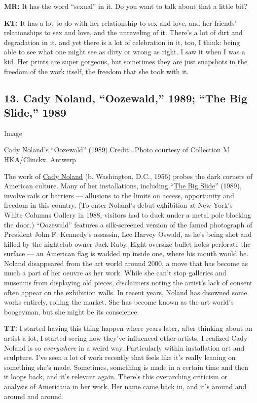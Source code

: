 \textbf{MR:} It has the word ``sexual'' in it. Do you want to talk about
that a little bit?

\textbf{KT:} It has a lot to do with her relationship to sex and love,
and her friends' relationships to sex and love, and the unraveling of
it. There's a lot of dirt and degradation in it, and yet there is a lot
of celebration in it, too, I think: being able to see what one might see
as dirty or wrong as right. I saw it when I was a kid. Her prints are
super gorgeous, but sometimes they are just snapshots in the freedom of
the work itself, the freedom that she took with it.

\hypertarget{13-cady-noland-oozewald-1989-the-big-slide-1989}{%
\subsection{13. Cady Noland, ``Oozewald,'' 1989; ``The Big Slide,''
1989}\label{13-cady-noland-oozewald-1989-the-big-slide-1989}}

Image

Cady Noland's ``Oozewald'' (1989).Credit...Photo courtesy of Collection
M HKA/Clinckx, Antwerp

The work of \href{http://ensembles.mhka.be/items/2245/assets/2517}{Cady
Noland} (b. Washington, D.C., 1956) probes the dark corners of American
culture. Many of her installations, including
``\href{https://www.artic.edu/artworks/186274/the-big-slide}{The Big
Slide}'' (1989), involve rails or barriers --- allusions to the limits
on access, opportunity and freedom in this country. (To enter Noland's
debut exhibition at New York's White Columns Gallery in 1988, visitors
had to duck under a metal pole blocking the door.) ``Oozewald'' features
a silk-screened version of the famed photograph of President John F.
Kennedy's assassin, Lee Harvey Oswald, as he's being shot and killed by
the nightclub owner Jack Ruby. Eight oversize bullet holes perforate the
surface --- an American flag is wadded up inside one, where his mouth
would be. Noland disappeared from the art world around 2000, a move that
has become as much a part of her oeuvre as her work. While she can't
stop galleries and museums from displaying old pieces, disclaimers
noting the artist's lack of consent often appear on the exhibition
walls. In recent years, Noland has disowned some works entirely, roiling
the market. She has become known as the art world's boogeyman, but she
might be its conscience.

\textbf{TT:} I started having this thing happen where years later, after
thinking about an artist a lot, I started seeing how they've influenced
other artists. I realized Cady Noland is so \emph{everywhere} in a weird
way. Particularly within installation art and sculpture. I've seen a lot
of work recently that feels like it's really leaning on something she's
made. Sometimes, something is made in a certain time and then it loops
back, and it's relevant again. There's this overarching criticism or
analysis of Americana in her work. Her name came back in, and it's
around and around and around.


